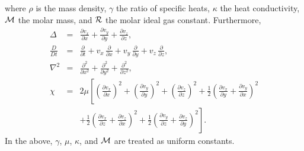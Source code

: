 where $\rho$ is the mass density, $\gamma$ the ratio of specific heats, $\kappa$ the heat conductivity, ${\cal M}$
the molar mass, and ${\cal R}$ the molar ideal gas constant. Furthermore,
\begin{eqnarray}
\Delta&=&\frac{\partial v_x}{\partial x} + \frac{\partial v_y}{\partial y} + \frac{\partial v_z}{\partial z},\\[0.5ex]
\frac{D}{Dt} &=& \frac{\partial}{\partial t} + v_x\,\frac{\partial }{\partial x} + v_y\,\frac{\partial}{\partial y} + v_z\,\frac{\partial}{\partial z},\\[0.5ex]
\nabla^2 &=&\frac{\partial^2}{\partial x^2} + \frac{\partial^2}{\partial y^2}+\frac{\partial^2}{\partial z^2},\\[0.5ex]
\chi &=&2\mu\left[\left(\frac{\partial v_x}{\partial x}\right)^2+\left(\frac{\partial v_y}{\partial y}\right)^2+
\left(\frac{\partial v_z}{\partial z}\right)^2+\frac{1}{2}\left(\frac{\partial v_x}{\partial y}+\frac{\partial v_y}{\partial x}\right)^2\right.\nonumber\\[0.5ex]
&&\left.+\frac{1}{2}\left(\frac{\partial v_x}{\partial z}+\frac{\partial v_z}{\partial x}\right)^2+\frac{1}{2}\left(\frac{\partial v_y}{\partial z}+\frac{\partial v_z}{\partial y}\right)^2\right].
\end{eqnarray}
In the above, $\gamma$, $\mu$, $\kappa$, and ${\cal M}$ are treated as uniform constants. 

